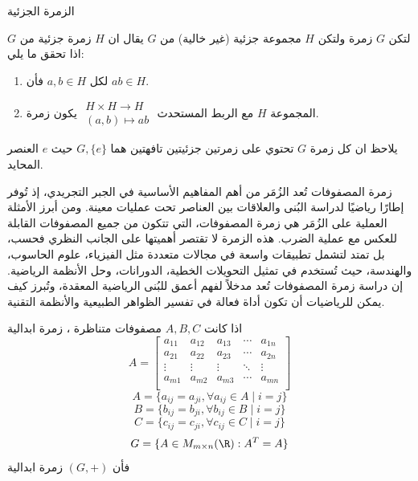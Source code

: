 		\begin{frame}{الزمرة الجزئية}
			\begin{definition}
				لتكن $G$ زمرة ولتكن $H$ مجموعة جزئية (غير خالية) من $G$ يقال ان $H$ زمرة جزئية من $G$ اذا تحقق ما يلي:
				\begin{enumerate}
					\item لكل $a,b\in H$ فأن $ab\in H$.
					\item المجموعة $H$ مع الربط المستحدث
					$
					\begin{array}{c}
						H\times H \to H\\
						(a, b) \mapsto ab
					\end{array}
					$
					يكون زمرة.
				\end{enumerate}
				
				\noindent 
				يلاحظ ان كل زمرة $G$ تحتوي على زمرتين جزئيتين تافهتين هما $G, \{e\}$ حيث $e$ العنصر المحايد. 
			\end{definition}
		\end{frame}
		
		\begin{frame}{زمرة المصفوفات}
			تُعد الزُمَر من أهم المفاهيم الأساسية في الجبر التجريدي، إذ تُوفر إطارًا رياضيًا لدراسة البُنى والعلاقات بين العناصر تحت عمليات معينة. ومن أبرز الأمثلة العملية على الزُمَر هي زمرة المصفوفات، التي تتكون من جميع المصفوفات القابلة للعكس مع عملية الضرب. هذه الزمرة لا تقتصر أهميتها على الجانب النظري فحسب، بل تمتد لتشمل تطبيقات واسعة في مجالات متعددة مثل الفيزياء، علوم الحاسوب، والهندسة، حيث تُستخدم في تمثيل التحويلات الخطية، الدورانات، وحل الأنظمة الرياضية. إن دراسة زمرة المصفوفات تُعد مدخلاً لفهم أعمق للبُنى الرياضية المعقدة، وتُبرز كيف يمكن للرياضيات أن تكون أداة فعالة في تفسير الظواهر الطبيعية والأنظمة التقنية.
		\end{frame}
		
		\begin{frame}
			\begin{theorem}
				اذا كانت \(A, B, C\) مصفوفات متناظرة ، زمرة ابدالية
				\[
				A =
				\begin{bmatrix}
					a_{11} & a_{12} & a_{13} & \cdots & a_{1n}\\
					a_{21} & a_{22} & a_{23} & \cdots & a_{2n}\\
					\vdots & \vdots & \vdots & \ddots & \vdots\\
					a_{m1} & a_{m2} & a_{m3} & \cdots & a_{mn}\\
				\end{bmatrix}
				\]
				\[
				A = \{a_{ij} = a_{ji}, \forall a_{ij}\in A \mid i = j\}
				\]
				\[
				B = \{b_{ij} = b_{ji}, \forall b_{ij}\in B \mid i = j\}
				\]
				\[
				C = \{c_{ij} = c_{ji}, \forall c_{ij}\in C \mid i = j\}
				\]
				\[
				G = \{A \in M_{m\times n}(\R)  : A^T = A\}
				\]
				 فأن $(G, +)$ زمرة ابدالية 
			\end{theorem}
		\end{frame}
		
